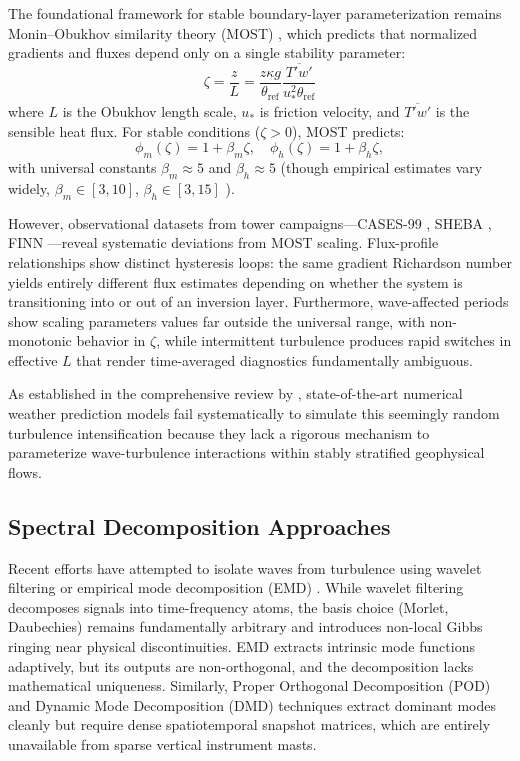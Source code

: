 \documentclass[11pt,a4paper]{article}
\begin{document}
The foundational framework for stable boundary-layer parameterization remains Monin--Obukhov similarity theory (MOST) \citep{Obukhov1946, Paulson1970}, which predicts that normalized gradients and fluxes depend only on a single stability parameter:
\begin{equation}
\zeta = \frac{z}{L} = \frac{z \kappa g}{\theta_{\mathrm{ref}}} \frac{\overline{T'w'}}{u_*^2 \theta_{\mathrm{ref}}}
\label{eq:zeta}
\end{equation}
where $L$ is the Obukhov length scale, $u_*$ is friction velocity, and $\overline{T'w'}$ is the sensible heat flux. For stable conditions ($\zeta > 0$), MOST predicts:
\begin{equation}
\phi_m(\zeta) = 1 + \beta_m\zeta, \quad \phi_h(\zeta) = 1 + \beta_h\zeta,
\end{equation}
with universal constants $\beta_m \approx 5$ and $\beta_h \approx 5$ (though empirical estimates vary widely, $\beta_m \in [3, 10]$, $\beta_h \in [3, 15]$ \citep{Dyer1974, Högström1988}).

However, observational datasets from tower campaigns---CASES-99 \citep{Poulos2002}, SHEBA \citep{Uttal2002}, FINN \citep{Mahrt2013}---reveal systematic deviations from MOST scaling. Flux-profile relationships show distinct hysteresis loops: the same gradient Richardson number yields entirely different flux estimates depending on whether the system is transitioning into or out of an inversion layer. Furthermore, wave-affected periods show scaling parameters values far outside the universal range, with non-monotonic behavior in $\zeta$, while intermittent turbulence produces rapid switches in effective $L$ that render time-averaged diagnostics fundamentally ambiguous.

As established in the comprehensive review by \citet{Sun2015}, state-of-the-art numerical weather prediction models fail systematically to simulate this seemingly random turbulence intensification because they lack a rigorous mechanism to parameterize wave-turbulence interactions within stably stratified geophysical flows.

\subsection{Spectral Decomposition Approaches}

Recent efforts have attempted to isolate waves from turbulence using wavelet filtering \citep{Vosper2006, Sun2015} or empirical mode decomposition (EMD) \citep{Huang1998}. While wavelet filtering decomposes signals into time-frequency atoms, the basis choice (Morlet, Daubechies) remains fundamentally arbitrary and introduces non-local Gibbs ringing near physical discontinuities. EMD extracts intrinsic mode functions adaptively, but its outputs are non-orthogonal, and the decomposition lacks mathematical uniqueness. Similarly, Proper Orthogonal Decomposition (POD) and Dynamic Mode Decomposition (DMD) techniques \citep{Schmid2010} extract dominant modes cleanly but require dense spatiotemporal snapshot matrices, which are entirely unavailable from sparse vertical instrument masts.
\end{document}
